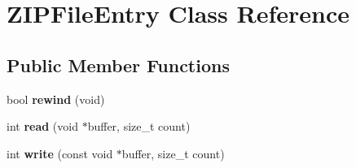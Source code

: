 \hypertarget{classZIPFileEntry}{\section{Z\-I\-P\-File\-Entry Class Reference}
\label{classZIPFileEntry}
}
\subsection*{Public Member Functions}
\begin{DoxyCompactItemize}
\item 
\hypertarget{classZIPFileEntry_afa5f1292d196a9c881195bfec56e383b}{bool {\bfseries rewind} (void)}\label{classZIPFileEntry_afa5f1292d196a9c881195bfec56e383b}

\item 
\hypertarget{classZIPFileEntry_a3fdbeb4dc4e5d0a67218afe5c3660aa0}{int {\bfseries read} (void $\ast$buffer, size\-\_\-t count)}\label{classZIPFileEntry_a3fdbeb4dc4e5d0a67218afe5c3660aa0}

\item 
\hypertarget{classZIPFileEntry_a194c3a97bb6af13d5918e46788a25f0c}{int {\bfseries write} (const void $\ast$buffer, size\-\_\-t count)}\label{classZIPFileEntry_a194c3a97bb6af13d5918e46788a25f0c}

\end{DoxyCompactItemize}
